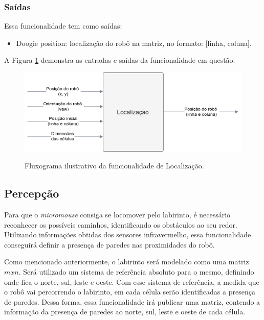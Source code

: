 \subsubsection{Saídas}
Essa funcionalidade tem como saídas:
\begin{itemize}
	\item Doogie position: localização do robô na matriz, no formato: [linha, coluna].
\end{itemize}

A Figura \ref{fig:especificacao_funcional_localizacao} demonstra as entradas e saídas da funcionalidade em questão.

\begin{figure}[H]
	\centering
	\caption{Fluxograma ilustrativo da funcionalidade de Localização.}
	\includegraphics[width=1\textwidth]
	{Figures/especificacao_funcional_localizacao}
	\label{fig:especificacao_funcional_localizacao}
\end{figure}

\subsection{Percepção}
\label{ssec:funcionalidade_percepcao} 
Para que o \textit{micromouse} consiga se locomover pelo labirinto, é necessário reconhecer os possíveis caminhos, identificando os obstáculos ao seu redor. Utilizando informações obtidas dos sensores infravermelho, essa funcionalidade conseguirá definir a presença de paredes nas proximidades do robô.
 
Como mencionado anteriormente, o labirinto será modelado como uma matriz $mxn$. Será utilizado um sistema de referência absoluto para o mesmo, definindo onde fica o norte, sul, leste e oeste. Com esse sistema de referência, a medida que o robô vai percorrendo o labirinto, em cada célula serão identificadas a presença de paredes. Dessa forma, essa funcionalidade irá publicar uma matriz, contendo a informação da presença de paredes ao norte, sul, leste e oeste de cada célula.

